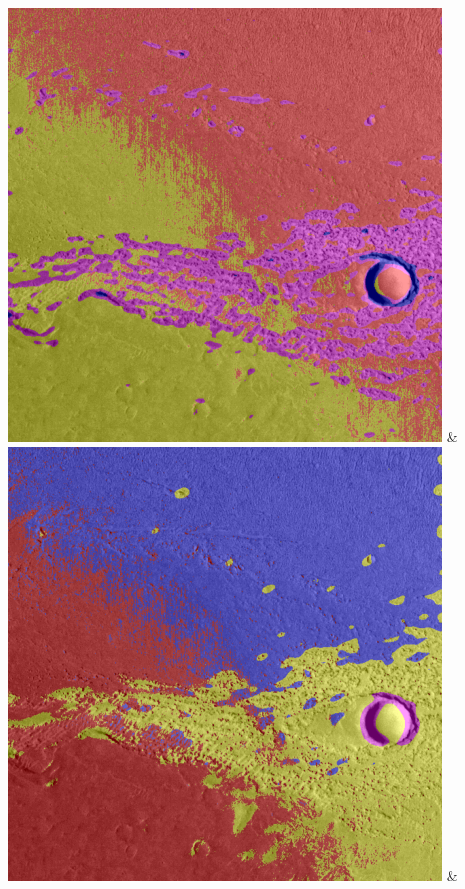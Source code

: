 \begin{table}[h!]
\begin{tabularx}{\textwidth}
		\includegraphics[width=0.9\linewidth]{images/gen/filter_size/p03_02.png_0.75.png} &
		\includegraphics[width=0.9\linewidth]{images/gen/filter_size/p03_02.png_1.00.png} &

\end{tabularx}
\end{table}
